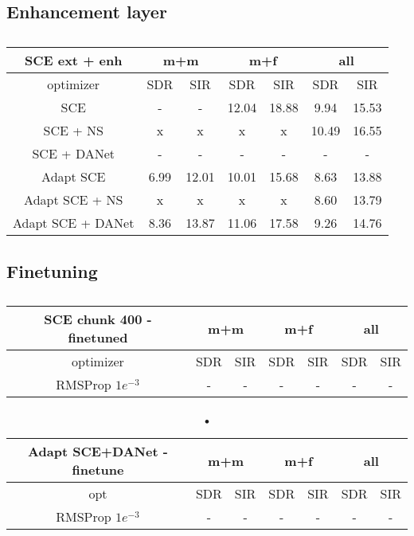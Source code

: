 \documentclass[master,final,11pt]{iscs-thesis}
\begin{document}
\subsection{Enhancement layer}
\label{enh}

\begin{table}[h]
\begin{tabular}{c|c|c|c|c|c|c}
SCE ext + enh & \multicolumn{2}{c|}{m+m} & \multicolumn{2}{c|}{m+f} & \multicolumn{2}{c}{all} \\ 
\hline 
optimizer & SDR & SIR & SDR & SIR & SDR & SIR \\ 
\hline
SCE  & - & - & 12.04 & 18.88 & 9.94 & 15.53 \\ 
SCE + NS & x & x & x & x & 10.49 & 16.55 \\ 
SCE + DANet  & - & - & - & - & - & - \\ 
\hline 
\hline 
Adapt SCE  & 6.99 & 12.01 & 10.01 & 15.68 & 8.63 & 13.88 \\ 
Adapt SCE + NS & x & x & x & x & 8.60 & 13.79 \\ 
Adapt SCE + DANet  & 8.36 & 13.87 & 11.06 & 17.58 & 9.26 & 14.76 \\ 

\end{tabular}
\captionsetup{justification=centering}
\caption{}
\label{table:SCE400enh}
\end{table}

\subsection{Finetuning}
\label{finetuning}


\begin{table}[h]
\begin{tabular}{c|c|c|c|c|c|c}
SCE chunk 400 - finetuned & \multicolumn{2}{c|}{m+m} & \multicolumn{2}{c|}{m+f} & \multicolumn{2}{c}{all} \\ 
\hline 
optimizer & SDR & SIR & SDR & SIR & SDR & SIR \\ 
\hline
RMSProp $1e^{-3}$  & - & - & - & - & - & - \\ 
\end{tabular}
\captionsetup{justification=centering}
\caption{}
\label{table:SCEfinetuning}
\end{table}

\begin{table}[h]
\begin{tabular}{c|c|c|c|c|c|c}
Adapt SCE+DANet - finetune & \multicolumn{2}{c|}{m+m} & \multicolumn{2}{c|}{m+f} & \multicolumn{2}{c}{all} \\ 
\hline 
opt & SDR & SIR & SDR & SIR & SDR & SIR \\ 
\hline
RMSProp $1e^{-3}$   & - & - & - & - & - & - \\ 
\end{tabular}

\caption{•}
\end{table}
\end{document}
